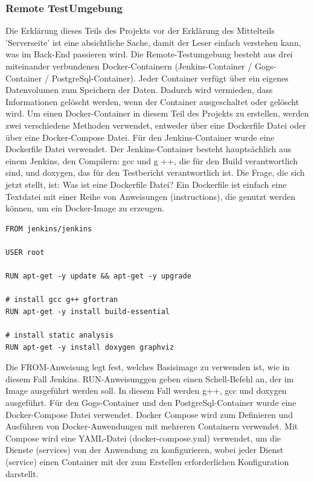 \documentclass[apaper4,12p]{scrartcl}
\begin{document}
\subsubsection{Remote TestUmgebung}
Die Erklärung dieses Teils des Projekts vor der Erklärung des Mittelteils 'Serverseite' ist eine absichtliche Sache, damit der Leser einfach verstehen kann, was im Back-End passieren wird.
\newline
Die Remote-Testumgebung besteht aus drei miteinander verbundenen Docker-Containern (Jenkins-Container / Gogs-Container / PostgreSql-Container). Jeder Container verfügt über ein eigenes Datenvolumen zum Speichern der Daten. Dadurch wird vermieden, dass Informationen gelöscht werden, wenn der Container ausgeschaltet oder gelöscht wird.
\newline
Um einen Docker-Container in diesem Teil des Projekts zu erstellen, werden zwei verschiedene Methoden verwendet, entweder über eine Dockerfile Datei oder über eine Docker-Compose Datei.
\newline
Für den Jenkins-Container wurde eine Dockerfile Datei verwendet. Der Jenkins-Container besteht hauptsächlich aus einem Jenkins, den Compilern: gcc und g ++, die für den Build verantwortlich sind, und doxygen, das für den Testbericht verantwortlich ist.
\newline
Die Frage, die sich jetzt stellt, ist: Was ist eine Dockerfile Datei?
\newline
Ein Dockerfile ist einfach eine Textdatei mit einer Reihe von Anweisungen (instructions), die genutzt werden können, um ein Docker-Image zu erzeugen.
\newline
\begin{lstlisting}[caption=Dockerfile - jenkins]
FROM jenkins/jenkins

USER root

RUN apt-get -y update && apt-get -y upgrade

# install gcc g++ gfortran
RUN apt-get -y install build-essential

# install static analysis
RUN apt-get -y install doxygen graphviz
\end{lstlisting}
Die FROM-Anweisung legt fest, welches Basisimage zu verwenden ist, wie in diesem Fall Jenkins. RUN-Anweisunggen geben einen Schell-Befehl an, der im Image ausgeführt werden soll. In diesem Fall werden g++, gcc und doxygen ausgeführt.
\newline
Für den Gogs-Container und den PostgreSql-Container wurde eine Docker-Compose Datei verwendet.
Docker Compose wird zum Definieren und Ausführen von Docker-Anwendungen mit mehreren Containern verwendet. Mit Compose wird eine YAML-Datei (docker-compose.yml) verwendet, um die Dienste (services) von der Anwendung zu konfigurieren, wobei jeder Dienst (service) einen Container mit der zum Erstellen erforderlichen Konfiguration darstellt.
\end{document}

